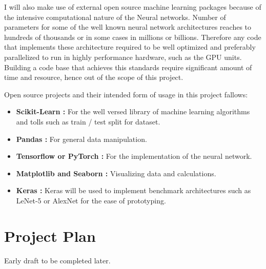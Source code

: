 \documentclass[12pt, twoside, a4paper]{article}
\begin{document}
I will also make use of external open source machine learning packages because of the intensive computational nature of the Neural networks. Number of parameters for some of the well known neural network architectures reaches to hundreds of thousands or in some cases in millions or billions. Therefore any code that implements these architecture required to be well optimized and preferably parallelized to run in highly performance hardware, such as the GPU units. Building a code base that achieves this standards require significant amount of time and resource, hence out of the scope of this project. 

Open source projects and their intended form of usage in this project fallows:

\begin{itemize}
    \item \textbf{Scikit-Learn \cite{scikit-learn}: }For the well versed library of machine learning algorithms and tolls such as train / test split for dataset.
    \item \textbf{Pandas \cite{pandas}: }For general data manipulation.
    \item \textbf{Tensorflow \cite{tensorflow} or PyTorch \cite{pytorch}: }For the implementation of the neural network.
    \item \textbf{Matplotlib \cite{matplotlib} and Seaborn \cite{seaborn}: }Visualizing data and calculations.
    \item \textbf{Keras \cite{keras}: }Keras will be used to implement benchmark architectures such as LeNet-5 or AlexNet for the ease of prototyping.
\end{itemize}
\clearpage

\section{Project Plan}
Early draft to be completed later.\\

\noindent{}

\clearpage

\printbibliography
{}
\end{document}
